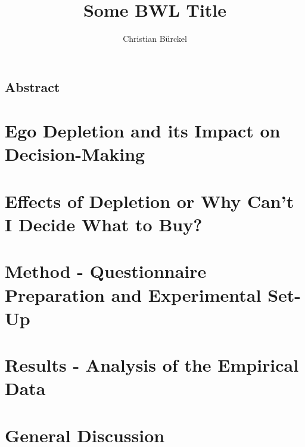 
\author{Christian Bürckel}
\title{Some BWL Title}




\maketitle
%
 \thispagestyle{plain} %
 \clearpage
 \thispagestyle{empty}
 \mbox{}
 \clearpage
 \pagestyle{bib} %
 \tableofcontents
 \clearpage
 \pagestyle{abstract}
 \section*{Abstract}
  
 \clearpage
 \pagestyle{main}
 \chapter{Ego Depletion and its Impact on Decision-Making}
  
 \chapter{Effects of Depletion or Why Can't I Decide What to Buy?}\label{chap:effectsofegodepletion}
  
 \chapter{Method - Questionnaire Preparation and Experimental Set-Up}
 
 \chapter{Results - Analysis of the Empirical Data}
 
 \chapter{General Discussion}
 
%
\clearpage
\pagestyle{bib}
\printbibliography
%
%

